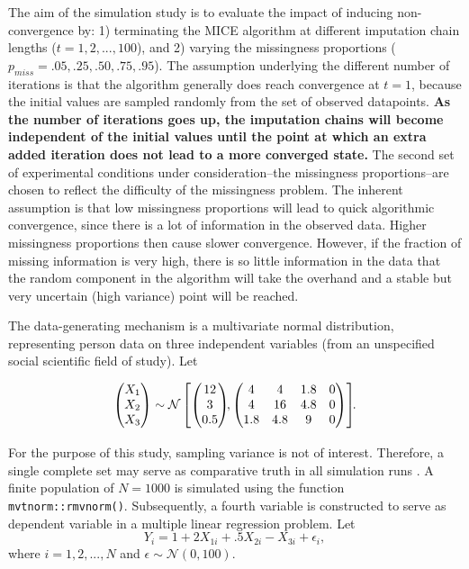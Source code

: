 \documentclass[Royal,times,sageh]{sagej}
\begin{document}
The aim of the simulation study is to evaluate the impact of inducing
non-convergence by: 1) terminating the MICE algorithm at different
imputation chain lengths (\(t = 1, 2, ..., 100\)), and 2) varying the
missingness proportions (\(p_{miss} = .05, .25, .50, .75, .95\)). The
assumption underlying the different number of iterations is that the
algorithm generally does reach convergence at \(t=1\), because the
initial values are sampled randomly from the set of observed datapoints.
\textbf{As the number of iterations goes up, the imputation chains will
become independent of the initial values until the point at which an
extra added iteration does not lead to a more converged state.} The
second set of experimental conditions under consideration--the
missingness proportions--are chosen to reflect the difficulty of the
missingness problem. The inherent assumption is that low missingness
proportions will lead to quick algorithmic convergence, since there is a
lot of information in the observed data. Higher missingness proportions
then cause slower convergence. However, if the fraction of missing
information is very high, there is so little information in the data
that the random component in the algorithm will take the overhand and a
stable but very uncertain (high variance) point will be reached.

The data-generating mechanism is a multivariate normal distribution,
representing person data on three independent variables (from an
unspecified social scientific field of study). Let

\begin{align*}
\begin{pmatrix}X_1\\
X_2\\
X_3
\end{pmatrix} \sim  \mathcal{N}
\begin{bmatrix}
\begin{pmatrix}
12\\
3\\
0.5
\end{pmatrix}\!\!,
\begin{pmatrix}
4 & 4 & 1.8 & 0\\
4 & 16 & 4.8 & 0\\
1.8 & 4.8 & 9 & 0
\end{pmatrix}
\end{bmatrix}\!\!\text{.}\\[2\jot]
\end{align*} For the purpose of this study, sampling variance is not of
interest. Therefore, a single complete set may serve as comparative
truth in all simulation runs \citep{vinknd}. A finite population of
\(N=1000\) is simulated using the function \texttt{mvtnorm::rmvnorm()}.
Subsequently, a fourth variable is constructed to serve as dependent
variable in a multiple linear regression problem. Let \[
Y_i =  1 + 2X_{1i} + .5X_{2i} - X_{3i} + \epsilon_i ,
\] where \(i = 1, 2, ..., N\) and \(\epsilon \sim \mathcal{N}(0, 100)\).
\end{document}
